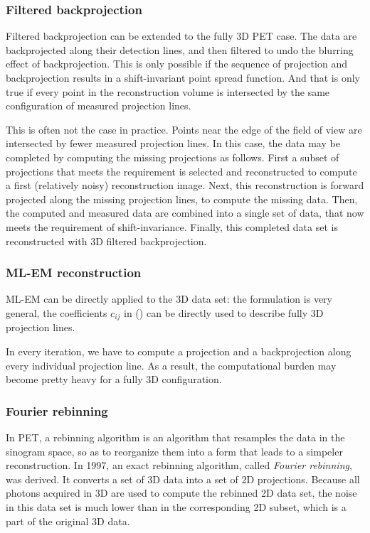 \subsubsection{Filtered backprojection}
Filtered backprojection can be extended to the fully 3D PET case. The data are
backprojected along their detection lines, and then filtered to undo the
blurring effect of backprojection. This is only possible if the sequence of
projection and backprojection results in a shift-invariant point spread
function. And that is only true if every point in the reconstruction volume is
intersected by the same configuration of measured projection lines.

This is often not the case in practice. Points near the edge of the field of
view are intersected by fewer measured projection lines. In this case, the
data may be completed by computing the missing projections as follows. First a
subset of projections that meets the requirement is selected and reconstructed
to compute a first (relatively noisy) reconstruction image. Next, this
reconstruction is forward projected along the missing projection lines, to
compute the missing data. Then, the computed and measured data are combined
into a single set of data, that now meets the requirement of shift-invariance.
Finally, this completed data set is reconstructed with 3D filtered
backprojection.

\subsubsection{ML-EM reconstruction}
ML-EM can be directly applied to the 3D data set: the formulation is very
general, the coefficients $c_{ij}$ in () can be directly used
to describe fully 3D projection lines.

In every iteration, we have to compute a projection and a backprojection along
every individual projection line. As a result, the computational burden may
become pretty heavy for a fully 3D configuration.


\subsubsection{Fourier rebinning}
In PET, a rebinning algorithm is an algorithm that resamples the data
in the sinogram space, so as to reorganize them into a form that
leads to a simpeler reconstruction.
%
In 1997, an exact rebinning algorithm, called {\em Fourier rebinning},
was derived. It converts a set of 3D data into a set of 2D
projections. Because all photons acquired in 3D are used to compute
the rebinned 2D data set, the noise in this data set is much lower
than in the corresponding 2D subset, which is a part of the original
3D data.

